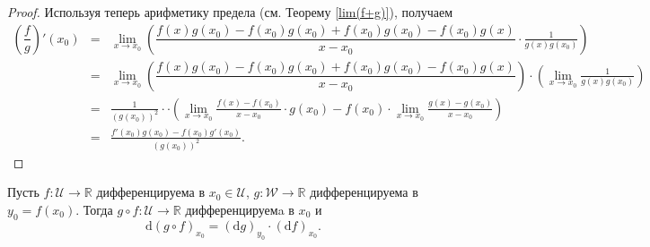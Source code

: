 \begin{proof}
Используя теперь арифметику предела (см. Теорему \ref{lim(f+g)}), получаем
\begin{eqnarray*}
   \left( \dfrac{f}{g} \right)'(x_0) &=& \lim_{x \to x_0}\left( \dfrac{f(x) g(x_0) - f(x_0)g(x_0) + f(x_0)g(x_0) - f(x_0)g(x)}{x-x_0} \cdot \frac{1}{g(x) g(x_0)} \right) \\
   &=& \lim_{x \to x_0}\left( \dfrac{f(x) g(x_0) - f(x_0)g(x_0) + f(x_0)g(x_0) - f(x_0)g(x)}{x-x_0}\right) \cdot\left( \lim_{x\to x_0} \frac{1}{g(x) g(x_0)} \right) \\
   &=& \frac{1}{(g(x_0))^2}\cdot \cdot \left( \lim_{x \to x_0} \frac{f(x) - f(x_0)}{x-x_0}\cdot g(x_0)  - f(x_0) \cdot \lim_{x\to x_0} \frac{g(x) - g(x_0)}{x-x_0}  \right) \\
   &=& \frac{f'(x_0)g(x_0) - f(x_0)g'(x_0)}{(g(x_0))^2}.
\end{eqnarray*}



\end{proof}






\begin{theorem}\label{d(fg)}
Пусть $f: \mathscr{U} \to \mathbb{R}$ дифференцируема в $x_0 \in \mathscr{U}$, $g: \mathscr{W} \to \mathbb{R}$ дифференцируема в $y_0= f(x_0)$. Тогда $g \circ f :\mathscr{U} \to \mathbb{R}$ дифференцируемa в $x_0$ и 
    \[
   \mathrm{d} ( g\circ f)_{x_0} = (\mathrm{d}g)_{y_0} \cdot (\mathrm{d}f)_{x_0}.
    \]
\end{theorem}


